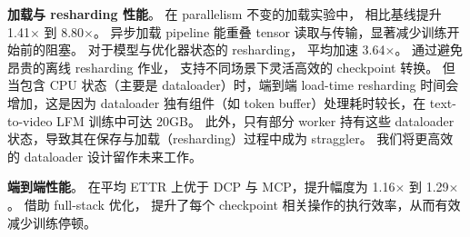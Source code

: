 \noindent \textbf{加载与 resharding 性能}。
在 parallelism 不变的加载实验中，\sys{} 相比基线提升 1.41$\times$ 到 8.80$\times$。
异步加载 pipeline 能重叠 tensor 读取与传输，显著减少训练开始前的阻塞。
对于模型与优化器状态的 resharding，\sys{} 平均加速 3.64$\times$。
通过避免昂贵的离线 resharding 作业，\sys{} 支持不同场景下灵活高效的 checkpoint 转换。
但当包含 CPU 状态（主要是 dataloader）时，端到端 load-time resharding 时间会增加，这是因为 dataloader 独有组件（如 token buffer）处理耗时较长，在 text-to-video LFM 训练中可达 20GB。
此外，只有部分 worker 持有这些 dataloader 状态，导致其在保存与加载（resharding）过程中成为 straggler。
我们将更高效的 dataloader 设计留作未来工作。

\noindent \textbf{端到端性能}。
\sys{} 在平均 ETTR 上优于 DCP 与 MCP，提升幅度为 1.16$\times$ 到 1.29$\times$。
借助 full-stack 优化，\sys{} 提升了每个 checkpoint 相关操作的执行效率，从而有效减少训练停顿。

\begin{table}[!t]
\caption{
保存优化 microbenchmark。
}
\label{tab:save_bench}
\begin{small}
\end{small}
\end{table}

